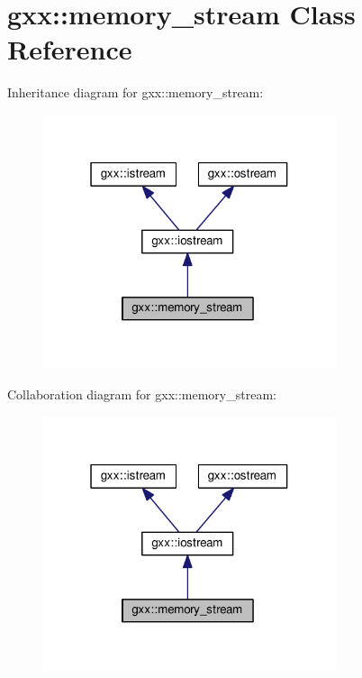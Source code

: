 \hypertarget{classgxx_1_1memory__stream}{}\section{gxx\+:\+:memory\+\_\+stream Class Reference}
\label{classgxx_1_1memory__stream}


Inheritance diagram for gxx\+:\+:memory\+\_\+stream\+:
\nopagebreak
\begin{figure}[H]
\begin{center}
\leavevmode
\includegraphics[width=244pt]{classgxx_1_1memory__stream__inherit__graph}
\end{center}
\end{figure}


Collaboration diagram for gxx\+:\+:memory\+\_\+stream\+:
\nopagebreak
\begin{figure}[H]
\begin{center}
\leavevmode
\includegraphics[width=244pt]{classgxx_1_1memory__stream__coll__graph}
\end{center}
\end{figure}
